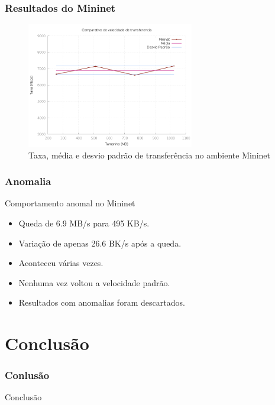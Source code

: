 \documentclass{beamer}
\begin{document}
\begin{frame}
    \frametitle{Resultados do Mininet}

    \begin{figure}[ht]
        \centering
        \includegraphics[width=0.65\textwidth]{data/taxa_mininet}
        \caption{Taxa, média e desvio padrão de transferência no ambiente Mininet}
        \label{fig:taxa_mininet}
    \end{figure}
\end{frame}

\begin{frame}
    \frametitle{Anomalia}

    Comportamento anomal no Mininet

    \begin{itemize}
        \item Queda de 6.9 MB/s para 495 KB/s.
        \item Variação de apenas 26.6 BK/s após a queda.
        \item Aconteceu várias vezes.
        \item Nenhuma vez voltou a velocidade padrão.
        \item Resultados com anomalias foram descartados.
    \end{itemize}
\end{frame}

\section{Conclusão}

\begin{frame}
    \frametitle{Conlusão}

    \begin{center}
        {\huge Conclusão}
    \end{center}

\end{frame}
\end{document}
